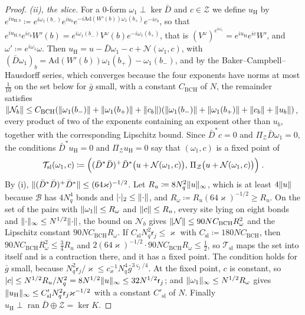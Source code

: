 \documentclass[11pt]{preprint}
\DeclarePairedDelimiter{\abs}{\lvert}{\rvert}
\DeclarePairedDelimiter{\norm}{\lVert}{\rVert}
\numberwithin{equation}{section}
\theoremstyle{definition}
\theoremstyle{remark}
\theoremstyle{plain}
\begin{document}
\begin{proof}
\emph{(ii), the slice.} For a $0$-form $\omega_1 \perp \ker\bar D$ and $c \in \mathcal Z$ we define $u_{\mathrm H}$ by $e^{iu_{\mathrm H,b}} \coloneqq e^{i\omega_1(b_-)}e^{iu_b}e^{-i\mathrm{Ad}(W'(b))\omega_1(b_+)}e^{-ic_b}$, so that $e^{iu_{\mathrm H,b}}e^{ic_b}W'(b) = e^{i\omega_1(b_-)}V^\omega(b)e^{-i\omega_1(b_+)}$, that is $(V^\omega)^{e^{i\omega_1}} = e^{iu_{\mathrm H}}e^{ic}W'$, and $\omega' \coloneqq e^{i\omega_1}\omega$. Then $u_{\mathrm H} = u - \bar D\omega_1 - c + \mathcal N(\omega_1, c)$, with $(\bar D\omega_1)_b = \mathrm{Ad}(W'(b))\omega_1(b_+) - \omega_1(b_-)$, and by the Baker--Campbell--Hausdorff series, which converges because the four exponents have norms at most $\frac1{10}$ on the set below for $\bar g$ small, with a constant $C_{\mathrm{BCH}}$ of $N$, the remainder satisfies $\norm{\mathcal N_b} \leq C_{\mathrm{BCH}}(\norm{\omega_1(b_-)} + \norm{\omega_1(b_+)} + \norm{c_b})(\norm{\omega_1(b_-)} + \norm{\omega_1(b_+)} + \norm{c_b} + \norm{u_b})$, every product of two of the exponents containing an exponent other than $u_b$, together with the corresponding Lipschitz bound. Since $\bar D^*c = 0$ and $\Pi_{\mathcal Z}\bar D\omega_1 = 0$, the conditions $\bar D^*u_{\mathrm H} = 0$ and $\Pi_{\mathcal Z}u_{\mathrm H} = 0$ say that $(\omega_1, c)$ is a fixed point of
\begin{equation}\label{eq:slice-map}
    \mathcal T_{\mathrm{sl}}(\omega_1, c) \coloneqq \Bigl((\bar D^*\bar D)^+\bar D^*\bigl(u + \mathcal N(\omega_1, c)\bigr),\, \Pi_{\mathcal Z}\bigl(u + \mathcal N(\omega_1, c)\bigr)\Bigr)\;.
\end{equation}
By (i), $\norm{(\bar D^*\bar D)^+\bar D^*} \leq (64\varkappa)^{-1/2}$. Let $R_u \coloneqq 8N_q^2\norm u_\infty$, which is at least $4\norm u$ because $\mathcal B$ has $4N_q^4$ bonds and $\abs\cdot_2 \leq \norm\cdot$, and $R_\omega \coloneqq R_u(64\varkappa)^{-1/2} \geq R_u$. On the set of the pairs with $\norm{\omega_1} \leq R_\omega$ and $\norm c \leq R_u$, every site lying on eight bonds and $\norm\cdot_\infty \leq N^{1/2}\norm\cdot$, the bound on $\mathcal N_b$ gives $\norm{\mathcal N} \leq 90NC_{\mathrm{BCH}}R_\omega^2$ and the Lipschitz constant $90NC_{\mathrm{BCH}}R_\omega$. If $C_{\mathrm{sl}}N_q^2\mathsf r_j \leq \varkappa$ with $C_{\mathrm{sl}} \coloneqq 180NC_{\mathrm{BCH}}$, then $90NC_{\mathrm{BCH}}R_\omega^2 \leq \frac34R_u$ and $2(64\varkappa)^{-1/2}\cdot90NC_{\mathrm{BCH}}R_\omega \leq \frac12$, so $\mathcal T_{\mathrm{sl}}$ maps the set into itself and is a contraction there, and it has a fixed point. The condition holds for $\bar g$ small, because $N_q^2\mathsf r_j/\varkappa \leq c_\varkappa^{-1}N_q^4\bar g^{3\varsigma_j/4}$. At the fixed point, $c$ is constant, so $\abs c \leq N^{1/2}R_u/N_q^2 = 8N^{1/2}\norm u_\infty \leq 32N^{1/2}\mathsf r_j$; and $\norm{\omega_1}_\infty \leq N^{1/2}R_\omega$ gives $\norm{u_{\mathrm H}}_\infty \leq C'_{\mathrm{sl}}N_q^2\mathsf r_j\varkappa^{-1/2}$ with a constant $C'_{\mathrm{sl}}$ of $N$. Finally $u_{\mathrm H} \perp \operatorname{ran}\bar D \oplus \mathcal Z = \ker K$.


\end{proof}
\end{document}
